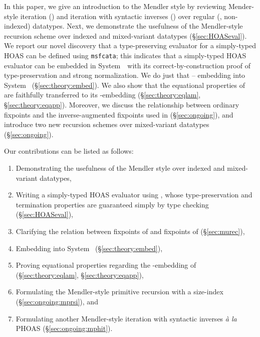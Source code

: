 In this paper, we give an introduction to the Mendler style by reviewing
Mender-style iteration (\MIt{}) and iteration with syntactic inverses (\msfit{})
over regular (\ie, non-indexed) datatypes. Next, we demonstrate the usefulness of
the Mendler-style recursion scheme \msfit{} over
indexed and mixed-variant datatypes (\S\ref{sec:HOASeval}).
We report our novel discovery that
a type-preserving evaluator for a simply-typed HOAS can be defined
using \lstinline{msfcata}; this indicates that a simply-typed HOAS evaluator
can be embedded in System~\Fw\ with its correct-by-construction proof of
type-preservation and strong normalization. We do just that -- embedding \msfit{}
into System \Fw\ (\S\ref{sec:theory:embed}). We also show that
the equational properties of \msfit{} are faithfully transferred to its
\Fw-embedding (\S\ref{sec:theory:eqlam}, \S\ref{sec:theory:eqapp}).
Moreover, we discuss the relationship between ordinary fixpoints and
the inverse-augmented fixpoints used in \msfit{} (\S\ref{sec:ongoing}),
and introduce two new recursion schemes over mixed-variant datatypes
(\S\ref{sec:ongoing}).

Our contributions can be listed as follows:
\begin{enumerate}
\item Demonstrating the usefulness of the Mendler style
	over indexed and mixed-variant datatypes,
\item Writing a simply-typed HOAS evaluator using \msfit{},
	whose type-preservation and termination properties are guaranteed
	simply by type checking (\S\ref{sec:HOASeval}),
\item Clarifying the relation between
	fixpoints of \MIt{} and fixpoints of \msfit{} (\S\ref{sec:murec}),
\item Embedding \msfit{} into System \Fw\ (\S\ref{sec:theory:embed}),
\item Proving equational properties regarding the \Fw-embedding of \msfit{} 
	(\S\ref{sec:theory:eqlam}, \S\ref{sec:theory:eqapp}),
\item Formulating the Mendler-style primitive recursion with a size-index %
	(\S\ref{sec:ongoing:mprsi}), and
\item Formulating another Mendler-style iteration with syntactic inverses
	\textit{\`a la} PHOAS (\S\ref{sec:ongoing:mphit}).
\end{enumerate}

